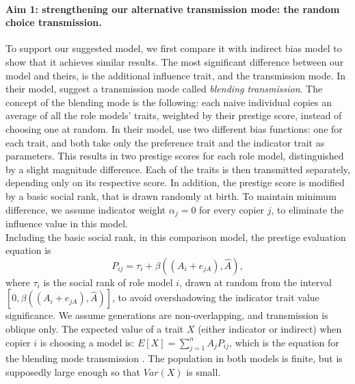 \documentclass[11pt]{article}
\begin{document}
   \paragraph{Aim 1: strengthening our alternative transmission mode: the random choice transmission.} 
   To support our suggested model, we first compare it with \citet{evolutionBook} indirect bias model to show that it achieves similar results. %
   The most significant difference between our model and theirs, is the additional influence trait, and the transmission mode. %
   In their model, \citet{evolutionBook} suggest a transmission mode called \textit{blending transmission}. %
   The concept of the blending mode is the following: each naive individual copies an average of all the role models' traits, weighted by their prestige score, instead of choosing one at random.  %
   In their model, \citet{evolutionBook} use two different bias functions: one for each trait, and both take only the preference trait and the indicator trait as parameters. %
   This results in two prestige scores for each role model, distinguished by a slight magnitude difference. %
   Each of the traits is then transmitted separately, depending only on its respective score. %
   In addition, the prestige score is modified by a basic social rank, that is drawn randomly at birth. %
   To maintain minimum difference, we assume indicator weight $\alpha_j=0$ for every copier $j$, to eliminate the influence value in this model.\\ %
   Including the basic social rank, in this comparison model, the prestige evaluation equation is
   \begin{equation}\label{prestige with social rank}
    	P_{ij} = \tau_i + \beta((A_i+e_{jA}),\hat{A}),
   \end{equation}
   where $\tau_i$ is the social rank of role model $i$, drawn at random from the interval $[0,\beta((A_i+e_{jA}),\hat{A})]$, to avoid overshadowing the indicator trait value significance.
   We assume generations are non-overlapping, and transmission is oblique only. %
   The expected value of a trait $X$ (either indicator or indirect) when copier $i$ is choosing a model is: $E[X] = \sum\limits_{j=1}^{n} A_j P_{ij}$, which is the equation for the blending mode transmission \citep[eq. 8.9, 8.10]{evolutionBook}. %
   The population in both models is finite, but is supposedly large enough so that $Var(X)$ is small. %
   
\end{document}
